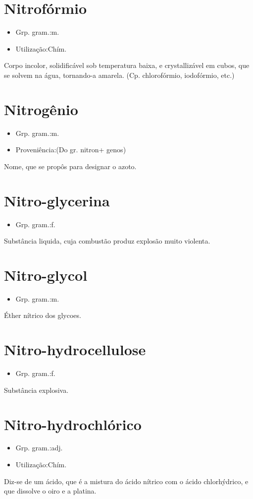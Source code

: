 \section{Nitrofórmio}
\begin{itemize}
\item {Grp. gram.:m.}
\end{itemize}
\begin{itemize}
\item {Utilização:Chím.}
\end{itemize}
Corpo incolor, solidificável sob temperatura baixa, e crystallizável em cubos, que se solvem na água, tornando-a amarela.
(Cp. \textunderscore chlorofórmio\textunderscore , \textunderscore iodofórmio\textunderscore , etc.)
\section{Nitrogênio}
\begin{itemize}
\item {Grp. gram.:m.}
\end{itemize}
\begin{itemize}
\item {Proveniência:(Do gr. \textunderscore nitron\textunderscore  + \textunderscore genos\textunderscore )}
\end{itemize}
Nome, que se propôs para designar o azoto.
\section{Nitro-glycerina}
\begin{itemize}
\item {Grp. gram.:f.}
\end{itemize}
Substância liquida, cuja combustão produz explosão muito violenta.
\section{Nitro-glycol}
\begin{itemize}
\item {Grp. gram.:m.}
\end{itemize}
Éther nítrico dos glycoes.
\section{Nitro-hydrocellulose}
\begin{itemize}
\item {Grp. gram.:f.}
\end{itemize}
Substância explosiva.
\section{Nitro-hydrochlórico}
\begin{itemize}
\item {Grp. gram.:adj.}
\end{itemize}
\begin{itemize}
\item {Utilização:Chím.}
\end{itemize}
Diz-se de um ácido, que é a mistura do ácido nítrico com o ácido chlorhýdrico, e que dissolve o oiro e a platina.
